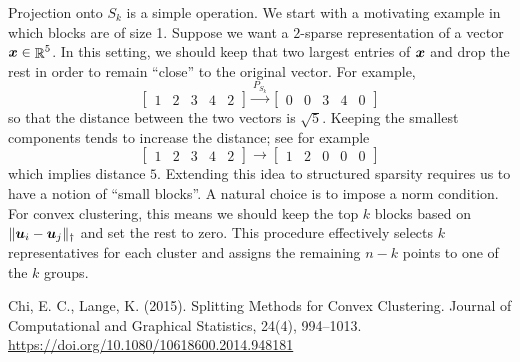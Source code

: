 \documentclass{article}
\begin{document}
Projection onto \(S_{k}\) is a simple operation.
We start with a motivating example in which blocks are of size 1.
Suppose we want a \(2\)-sparse representation of a vector \(\boldsymbol{x} \in \mathop{\mathbb{R}}\nolimits^{5}\).
In this setting, we should keep that two largest entries of \(\boldsymbol{x}\) and drop the rest in order to remain ``close'' to the original vector.
For example,
\begin{equation*}
    \begin{bmatrix}
        1 & 2 & 3 & 4 & 2
    \end{bmatrix}
    \overset{P_{S_{k}}}{\longrightarrow}
    \begin{bmatrix}
        0 & 0 & 3 & 4 & 0
    \end{bmatrix}
\end{equation*}
so that the distance between the two vectors is \(\sqrt{5}\).
Keeping the smallest components tends to increase the distance; see for example
\begin{equation*}
    \begin{bmatrix}
        1 & 2 & 3 & 4 & 2
    \end{bmatrix}
    {\longrightarrow}
    \begin{bmatrix}
        1 & 2 & 0 & 0 & 0
    \end{bmatrix}
\end{equation*}
which implies distance \(5\).
Extending this idea to structured sparsity requires us to have a notion of ``small blocks''.
A natural choice is to impose a norm condition.
For convex clustering, this means we should keep the top $k$ blocks based on \(\|\boldsymbol{u}_{i} - \boldsymbol{u}_{j}\|_{\dagger}\) and set the rest to zero.
This procedure effectively selects $k$ representatives for each cluster and assigns the remaining $n - k$ points to one of the \(k\) groups.

\begin{thebibliography}{1}
    Chi, E. C., Lange, K. (2015). {Splitting Methods for Convex Clustering}. {Journal of Computational and Graphical Statistics}, 24(4), 994–1013. \url{https://doi.org/10.1080/10618600.2014.948181}
\end{thebibliography}
\end{document}
